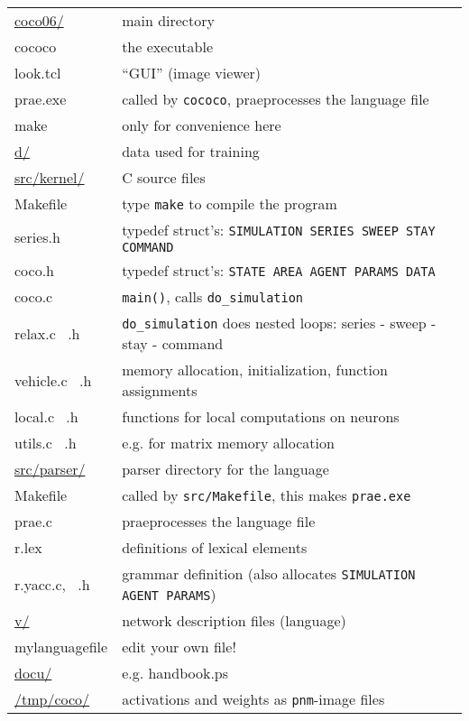 \documentclass[12pt]{article}
\begin{document}
\begin{tabular}{ll}
\underline{coco06/}       & main directory \\
{\color{blue}cococo}      & the executable \\
{\color{blue}look.tcl}    & ``GUI'' (image viewer) \\
prae.exe                  & called by \texttt{cococo}, praeprocesses the language file \\
make                      & only for convenience here \\[6pt]

\underline{d/}            & data used for training \\[6pt]

\underline{src/kernel/}   & C source files \\
Makefile                  & type \texttt{make} to compile the program \\
series.h                  & typedef struct's: \texttt{SIMULATION SERIES SWEEP STAY COMMAND} \\
coco.h                    & typedef struct's: \texttt{STATE AREA AGENT PARAMS DATA} \\[6pt]

coco.c                    & \texttt{main()}, calls \texttt{do\_simulation} \\
relax.c ~.h               & \texttt{do\_simulation} does nested loops: series - sweep - stay - command \\
vehicle.c ~.h             & memory allocation, initialization, function assignments \\[6pt]

local.c ~.h               & functions for local computations on neurons \\

utils.c ~.h               & e.g. for matrix memory allocation \\[6pt]

\underline{src/parser/}   & parser directory for the language \\
 Makefile                 & called by \texttt{src/Makefile}, this makes \texttt{prae.exe} \\
 prae.c                   & praeprocesses the language file \\
 r.lex                    & definitions of lexical elements \\
 r.yacc.c, ~.h            & grammar definition (also allocates \texttt{SIMULATION AGENT PARAMS}) \\[6pt]

\underline{v/}            & network description files (language) \\
{\color{blue}mylanguagefile} & edit your own file! \\[6pt]

\underline{docu/}         & e.g. handbook.ps \\[6pt]

\underline{/tmp/coco/}    & activations and weights as \texttt{pnm}-image files \\

\end{tabular}
\end{document}
